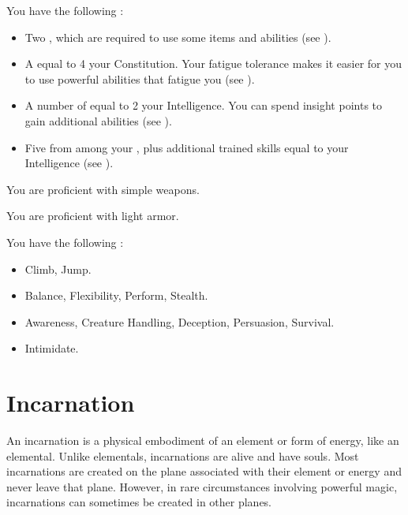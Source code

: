          You have the following :
        \begin{itemize}
            \item Two , which are required to use some items and abilities (see ).
            \item A  equal to 4 \add your Constitution.
                Your fatigue tolerance makes it easier for you to use powerful abilities that fatigue you (see ).
            \item A number of  equal to 2 \add your Intelligence.
                You can spend insight points to gain additional abilities (see ).
            \item Five  from among your , plus additional trained skills equal to your Intelligence (see ).
        \end{itemize}

        You are proficient with simple weapons.

        You are proficient with light armor.

        You have the following :
        \begin{itemize}
            \item {} Climb, Jump.
            \item {} Balance, Flexibility, Perform, Stealth.
            \item {} Awareness, Creature Handling, Deception, Persuasion, Survival.
            \item {} Intimidate.
        \end{itemize}

\section{Incarnation}

    An incarnation is a physical embodiment of an element or form of energy, like an elemental.
    Unlike elementals, incarnations are alive and have souls.
    Most incarnations are created on the plane associated with their element or energy and never leave that plane.
    However, in rare circumstances involving powerful magic, incarnations can sometimes be created in other planes.

